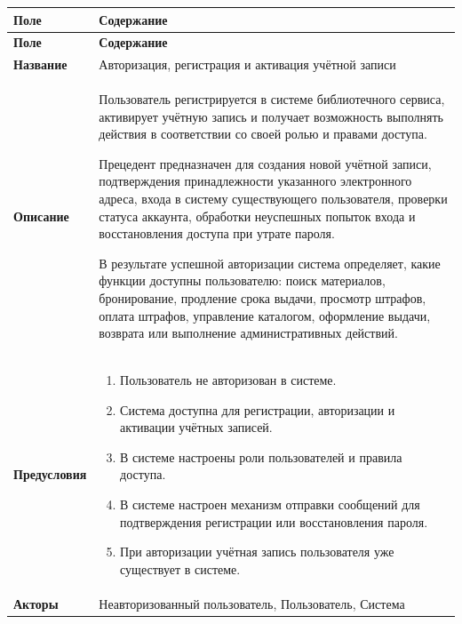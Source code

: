 \documentclass[12pt,a4paper]{article}
\begin{document}
	\begin{xltabular}{\textwidth}{
			|>{\raggedright\arraybackslash}p{2.7cm}
			|>{\raggedright\arraybackslash}X|
		}
		\hline
		\textbf{Поле} & \textbf{Содержание} \\
		\hline
		\endfirsthead
		
		\hline
		\textbf{Поле} & \textbf{Содержание} \\
		\hline
		\endhead
		
		\hline
		\endfoot
		
		\textbf{Название} &
		Авторизация, регистрация и активация учётной записи \\
		\hline
		
		\textbf{Описание} &
		Пользователь регистрируется в системе библиотечного сервиса,
		активирует учётную запись и получает возможность выполнять действия
		в соответствии со своей ролью и правами доступа.
		
		Прецедент предназначен для создания новой учётной записи,
		подтверждения принадлежности указанного электронного адреса, входа
		в систему существующего пользователя, проверки статуса аккаунта,
		обработки неуспешных попыток входа и восстановления доступа при
		утрате пароля.
		
		В результате успешной авторизации система определяет, какие функции
		доступны пользователю: поиск материалов, бронирование, продление
		срока выдачи, просмотр штрафов, оплата штрафов, управление
		каталогом, оформление выдачи, возврата или выполнение
		административных действий. \\
		\hline
		
		\textbf{Предусловия} &
		\begin{enumerate}
			\item Пользователь не авторизован в системе.
			\item Система доступна для регистрации, авторизации и активации
			учётных записей.
			\item В системе настроены роли пользователей и правила доступа.
			\item В системе настроен механизм отправки сообщений для
			подтверждения регистрации или восстановления пароля.
			\item При авторизации учётная запись пользователя уже существует
			в системе.
		\end{enumerate} \\
		\hline
		
		\textbf{Акторы} &
		Неавторизованный пользователь, Пользователь, Система \\
		\hline
		

\end{xltabular}
\end{document}
